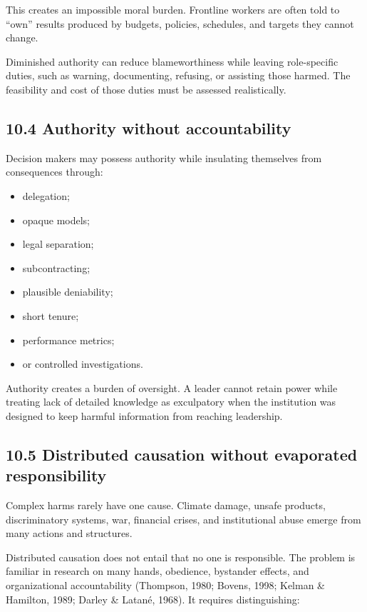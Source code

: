 \documentclass[
  11pt,
]{article}
\providecommand{\tightlist}{%
  \setlength{\itemsep}{0pt}\setlength{\parskip}{0pt}}
\begin{document}
This creates an impossible moral burden. Frontline workers are often
told to ``own'' results produced by budgets, policies, schedules, and
targets they cannot change.

Diminished authority can reduce blameworthiness while leaving
role-specific duties, such as warning, documenting, refusing, or
assisting those harmed. The feasibility and cost of those duties must be
assessed realistically.

\subsection{10.4 Authority without
accountability}\label{authority-without-accountability}

Decision makers may possess authority while insulating themselves from
consequences through:

\begin{itemize}
\tightlist
\item
  delegation;
\item
  opaque models;
\item
  legal separation;
\item
  subcontracting;
\item
  plausible deniability;
\item
  short tenure;
\item
  performance metrics;
\item
  or controlled investigations.
\end{itemize}

Authority creates a burden of oversight. A leader cannot retain power
while treating lack of detailed knowledge as exculpatory when the
institution was designed to keep harmful information from reaching
leadership.

\subsection{10.5 Distributed causation without evaporated
responsibility}\label{distributed-causation-without-evaporated-responsibility}

Complex harms rarely have one cause. Climate damage, unsafe products,
discriminatory systems, war, financial crises, and institutional abuse
emerge from many actions and structures.

Distributed causation does not entail that no one is responsible. The
problem is familiar in research on many hands, obedience, bystander
effects, and organizational accountability (Thompson, 1980; Bovens,
1998; Kelman \& Hamilton, 1989; Darley \& Latané, 1968). It requires
distinguishing:
\end{document}
